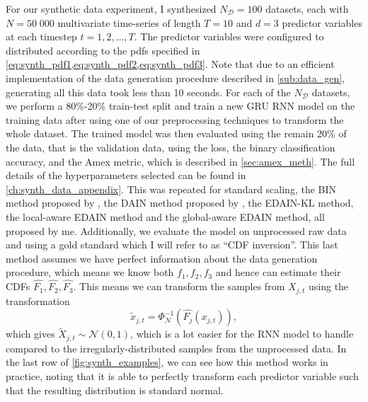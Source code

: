\documentclass{statsmsc}
\begin{document}
{%
For our synthetic data experiment, I synthesized $N_\mathcal{D}=100$ datasets, each with
$N=50\;000$ multivariate time-series of length $T=10$ and  $d=3$ predictor variables at each
timestep $t=1,2,\dots,T$. The predictor variables were configured to distributed according to
the \acp{pdf} specified in \cref{eq:synth_pdf1,eq:synth_pdf2,eq:synth_pdf3}. Note that due to
an efficient implementation of the data generation procedure described in
\cref{sub:data_gen}, generating all this data took less than 10 seconds.
For each of the $N_{\mathcal{D}}$ datasets, we perform a 80\%-20\% train-test split and train
a new \ac{GRU} \ac{RNN} model on the training data after
using one of our preprocessing techniques to transform the whole dataset. The trained model
was then evaluated using the remain 20\% of the data, that is the validation data, using
the loss, the binary classification accuracy, and the Amex metric, which is described
in \cref{sec:amex_meth}. The full details of the hyperparameters selected can be found in
\cref{ch:synth_data_appendix}. This was repeated for standard scaling, the \ac{BIN} method
proposed by \cite{bin}, the \ac{DAIN} method proposed by \cite{dain}, the \ac{EDAIN-KL} method,
the local-aware \ac{EDAIN} method and the global-aware \ac{EDAIN} method, all proposed by me.
Additionally, we evaluate the model on unprocessed raw data and using a gold standard which I will
refer to as ``\ac{CDF} inversion''. This last method assumes we have perfect information about the
data generation procedure, which means we know both $f_1,f_2,f_3$ and hence can
estimate their \acp{CDF} $\widehat{F_1},\widehat{F_2},\widehat{F_3}$.
This means we can transform the samples from $X_{j,t}$ using the transformation
\begin{equation}
    \tilde{x}_{j,t}=\Phi_{\mathcal{N}}^{-1}\left(\widehat{F_j}(x_{j,t})\right),
\end{equation}
which gives $\tilde{X}_{j,t} \sim \mathcal{N}(0,1)$, which is a lot easier for the \ac{RNN} model
to handle compared to the irregularly-distributed samples from the unprocessed data.
In the last row of \cref{fig:synth_examples}, we can see how this method works in practice,
noting that it is able to perfectly transform each predictor variable such that the resulting
distribution is standard normal.

}
\end{document}
